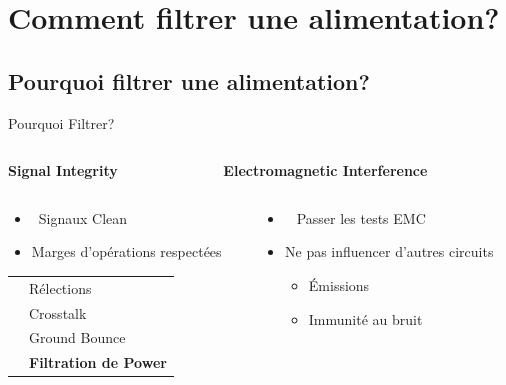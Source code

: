 
\section{Comment filtrer une alimentation?}


\subsection{Pourquoi filtrer une alimentation?}

\begin{frame}{Pourquoi Filtrer?}
    \begin{columns}
        \begin{column}{0.5\textwidth}
            \begin{center}
                \textbf{Signal Integrity}
            \end{center}
        \end{column}
        \begin{column}{0.5\textwidth}
            \begin{center}
                \textbf{Electromagnetic Interference}
            \end{center}
        \end{column}
    \end{columns}
    \begin{columns}
        \begin{column}{0.5\textwidth}
            \begin{itemize}
                \item[] \itemicon{\faWater} ~Signaux Clean
                \item Marges d'opérations respectées
            \end{itemize}

            \centering
            \begin{tabular}{c l}
                \icon{\faUndo}      & Rélections \\
                \icon{\faExchange*} & Crosstalk \\
                \icon{\faCompress}  & Ground Bounce \\
                \icon{\faFilter}    & \textbf{Filtration de Power} \\
            \end{tabular}
        \end{column}
        \begin{column}{0.5\textwidth}
            \begin{itemize}
                \item[] \itemicon[red]{\faClipboardCheck} ~ Passer les tests EMC
                \item Ne pas influencer d'autres circuits
                \begin{itemize}
                    \item Émissions
                    \item Immunité au bruit
                \end{itemize}


\end{itemize}
\end{column}
\end{columns}
\end{frame}
